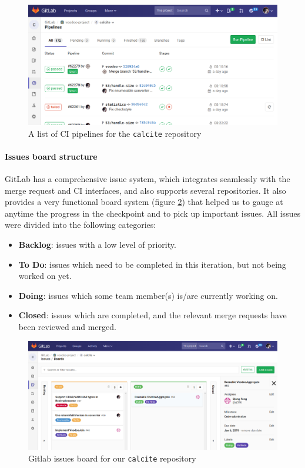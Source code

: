 \begin{figure}[h]
    \centering
    \includegraphics[width=0.98\linewidth, trim={0 0 6cm 7cm}, clip]{project-management/pipeline.png}
    \caption{A list of CI pipelines for the \texttt{calcite} repository}
    \label{fig:calcite-pipeline}
\end{figure}

\paragraph{Issues board structure}
GitLab has a comprehensive issue system, which integrates seamlessly with the merge request and CI interfaces, and also supports several repositories. It also provides a very functional board system (figure \ref{fig:gitlab-issues}) that helped us to gauge at anytime the progress in the checkpoint and to pick up important issues. All issues were divided into the following categories:

\begin{itemize}\itemsep0.2em
    \item \textbf{Backlog}: issues with a low level of priority.
    \item \textbf{To Do}: issues which need to be completed in this iteration, but not being worked on yet.
    \item \textbf{Doing}: issues which some team member(s) is/are currently working on.
    \item \textbf{Closed}: issues which are completed, and the relevant merge requests have been reviewed and merged.
\end{itemize}

\begin{figure}[h]
    \centering
    \includegraphics[width=0.98\linewidth, trim={0 0 0 7cm}, clip]{project-management/gitlab-issues.png}
    \caption{Gitlab issues board for our \texttt{calcite} repository}
    \label{fig:gitlab-issues}
\end{figure}

